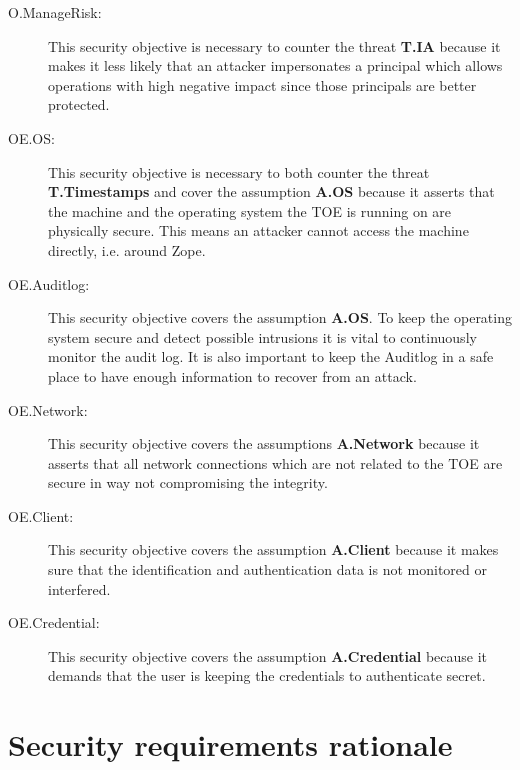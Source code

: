 \documentclass[12pt,english]{scrbook}
\begin{document}
\begin{description}
  \item[O.ManageRisk:] This security objective is necessary to counter the
  threat \textbf{T.IA} because it makes it less likely that an attacker
  impersonates a principal which allows operations with high negative impact
  since those principals are better protected.

  \item[OE.OS:] This security objective is necessary to both counter the
  threat \textbf{T.Timestamps} and cover the assumption \textbf{A.OS} because
  it asserts that the machine and the operating system the TOE is running on
  are physically secure. This means an attacker cannot access the machine
  directly, i.e. around Zope.

  \item[OE.Auditlog:] This security objective covers the assumption
  \textbf{A.OS}. To keep the operating system secure and detect possible
  intrusions it is vital to continuously monitor the audit log. It is also
  important to keep the Auditlog in a safe place to have enough information to
  recover from an attack.

  \item[OE.Network:] This security objective covers the assumptions
  \textbf{A.Network} because it asserts that all
  network connections which are not related to the TOE are secure in way not
  compromising the integrity.

  \item[OE.Client:] This security objective covers the assumption
  \textbf{A.Client} because it makes sure that the identification and
  authentication data is not monitored or interfered.

  \item[OE.Credential:] This security objective covers the assumption
  \textbf{A.Credential} because it demands that the user is keeping the
  credentials to authenticate secret.
  
\end{description}



\section{Security requirements rationale}
\end{document}
